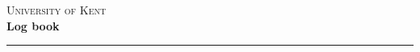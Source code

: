 \begin{titlepage}


\center

\textsc{\LARGE University of Kent}\\[5.5cm]
\textbf{\Large Log book}
\rule{\linewidth}{0.2mm}\\[0.3cm]
\\[2.0cm]
\\[0.2cm]
\\[0.2cm]


\end{titlepage}